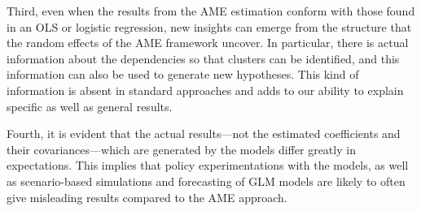Third, even when the results from the AME estimation conform with those found in an OLS or logistic regression, new insights can emerge from the structure that the random effects of the AME framework uncover. In particular, there is actual information about the dependencies so that clusters can be identified, and this information can also be used to generate new hypotheses. This kind of information is absent in standard approaches and adds to our ability to explain specific as well as general results.

Fourth, it is evident that the actual results---not the estimated coefficients and their covariances---which are generated by the models differ greatly in expectations.  This implies that policy experimentations with the models, as well as scenario-based simulations and forecasting of GLM models are likely to often give misleading results compared to the AME approach.
